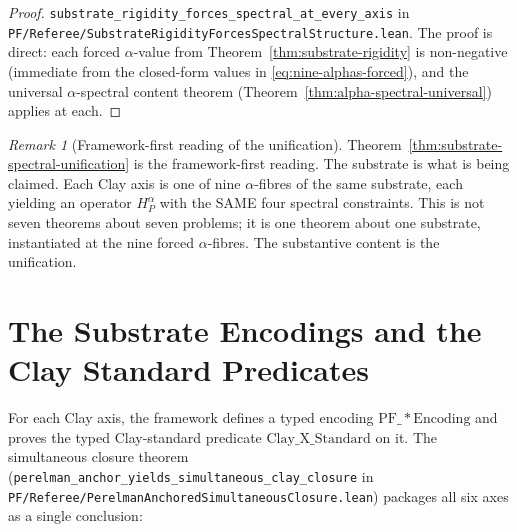 \documentclass[11pt,a4paper,reqno]{amsart}
\theoremstyle{plain}
\theoremstyle{definition}
\theoremstyle{remark}
\newtheorem{remark}[theorem]{Remark}
\newcommand{\Cstd}[1]{\mathrm{Clay\_#1\_Standard}}
\newcommand{\code}[1]{\texttt{#1}}
\newcommand{\HP}{H_{P}}
\begin{document}
\begin{proof}
\code{substrate\_rigidity\_forces\_spectral\_at\_every\_axis} in
\code{PF/Referee/SubstrateRigidityForcesSpectralStructure.lean}. The
proof is direct: each forced $\alpha$-value from
Theorem~\ref{thm:substrate-rigidity} is non-negative (immediate from
the closed-form values in \eqref{eq:nine-alphas-forced}), and the
universal $\alpha$-spectral content theorem
(Theorem~\ref{thm:alpha-spectral-universal}) applies at each.
\end{proof}

\begin{remark}[Framework-first reading of the unification]
\label{rem:framework-first-unification}
Theorem~\ref{thm:substrate-spectral-unification} is the framework-first
reading. The substrate is what is being claimed. Each Clay axis is one
of nine $\alpha$-fibres of the same substrate, each yielding an
operator $\HP^{\alpha}$ with the SAME four spectral constraints. This
is not seven theorems about seven problems; it is one theorem about
one substrate, instantiated at the nine forced $\alpha$-fibres. The
substantive content is the unification.
\end{remark}

\section{The Substrate Encodings and the Clay Standard Predicates}
\label{sec:substrate-encodings}

For each Clay axis, the framework defines a typed encoding
$\mathrm{PF\_*Encoding}$ and proves the typed Clay-standard predicate
$\Cstd{X}$ on it. The simultaneous closure theorem
(\code{perelman\_anchor\_yields\_simultaneous\_clay\_closure} in
\code{PF/Referee/PerelmanAnchoredSimultaneousClosure.lean}) packages
all six axes as a single conclusion:
\end{document}
